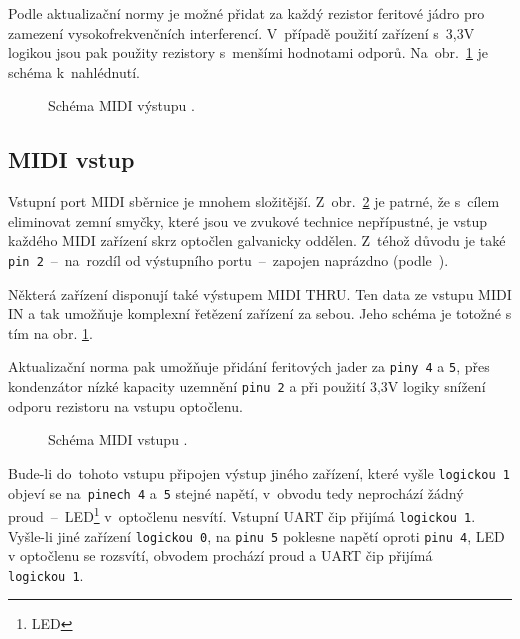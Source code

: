 Podle aktualizační normy \cite{MIDIupd} je možné přidat za každý rezistor feritové jádro pro zamezení vysokofrekvenčních interferencí. V~případě použití zařízení s~3,3\unit{V} logikou jsou pak použity rezistory s~menšími hodnotami odporů. Na~obr.~\ref{fig:schMIDIout} je schéma k~nahlédnutí.

\begin{figure}[h]
    \centering
    
    \caption{Schéma \acs{MIDI} výstupu \cite{MIDIspecs}.}
    \label{fig:schMIDIout}
\end{figure}

\subsection{MIDI vstup}



Vstupní port \acs{MIDI} sběrnice je mnohem složitější. Z~obr.~\ref{fig:schMIDIin} je patrné, že s~cílem eliminovat zemní smyčky, které jsou ve zvukové technice nepřípustné, je vstup každého \acs{MIDI} zařízení skrz optočlen galvanicky oddělen. Z~téhož důvodu je také \texttt{pin~2}~--~na~rozdíl od  výstupního portu~--~zapojen naprázdno (podle~\cite{MIDIspecs}). 

Některá zařízení disponují také výstupem \acs{MIDI} THRU. Ten  data ze vstupu \acs{MIDI} IN a tak umožňuje komplexní řetězení zařízení za sebou. Jeho schéma je totožné s tím na obr. \ref{fig:schMIDIout}.

Aktualizační norma \cite{MIDIupd} pak umožňuje přidání feritových jader za \texttt{piny 4} a \texttt{5}, přes kondenzátor nízké kapacity uzemnění \texttt{pinu 2} a při použití 3,3\unit{V} logiky snížení odporu rezistoru na vstupu optočlenu.

\begin{figure}[h]
    \centering
    
    \caption{Schéma MIDI vstupu \cite{MIDIspecs}.}
    \label{fig:schMIDIin}
\end{figure}

Bude-li do~tohoto vstupu připojen výstup jiného zařízení, které vyšle \linebreak \texttt{logickou~1} objeví se na~\texttt{pinech~4} a~\texttt{5} stejné napětí, v~obvodu tedy neprochází žádný proud~--~\acs{LED}\footnote{\acl{LED}} v~optočlenu nesvítí. Vstupní UART čip přijímá \texttt{logickou~1}. Vyšle-li jiné zařízení \texttt{logickou 0}, na \texttt{pinu~5} poklesne napětí oproti \texttt{pinu~4}, \acs{LED} v optočlenu se rozsvítí, obvodem prochází proud a UART čip přijímá \texttt{logickou~1}.

